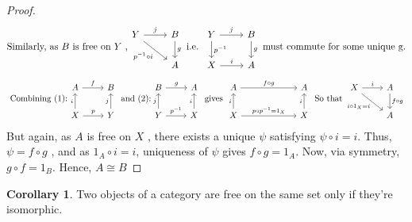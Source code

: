 \documentclass{article}
\theoremstyle{definition}
\theoremstyle{definition}
\newtheorem{corollary}{Corollary}[theorem]
\begin{document}
\begin{proof}
	\begin{equation}
		\text{Similarly, as $ B$  is free on $ Y $ ,}
		\begin{tikzcd}
			Y \arrow{r}{j} \arrow[swap]{dr}{p^{-1} \circ i} & B  \arrow{d}{g} \\ & A
		\end{tikzcd}
		\text{ i.e. }
		\begin{tikzcd}
			Y \arrow{r}{j} \arrow{d}{p^{-1}} & B  \arrow{d}{g} \\ X \arrow{r}{i} & A
		\end{tikzcd}
		\text{ must commute for some unique g.}
	\end{equation}
	\begin{equation*}
		\text{ Combining (1):}
		\begin{tikzcd}
			A \arrow{r}{f} & B \\ X \arrow{u}{i} \arrow{r}{p} & Y\arrow{u}{j}
		\end{tikzcd}
		\text{ and (2):}
		\begin{tikzcd}
			B \arrow{r}{g} & A \\ Y \arrow{u}{j} \arrow{r}{p^{-1}} & X\arrow{u}{i}
		\end{tikzcd}
		\text{ gives }
		\begin{tikzcd}
			A \arrow{r}{f \circ g} &[4em] A \\ X \arrow{u}{i} \arrow{r}{p \circ p^{-1} = 1_X} & X\arrow{u}{i}
		\end{tikzcd}
		\text{ So that }
		\begin{tikzcd}
			X \arrow{r}{i} \arrow[swap]{dr}{i \circ 1_X = i} &A \arrow{d}{f \circ g} \\ &A
		\end{tikzcd}
	\end{equation*}
	But again, as $ A $ is free on $ X $ , there exists a unique $ \psi $ satisfying $ \psi \circ i = i $. Thus, $ \psi = f \circ g $ , and as $ 1_A \circ i = i $, uniqueness of $ \psi $ gives $ f \circ g = 1_A $. Now, via symmetry, $ g \circ f = 1_B $. Hence, $A \cong B$
\end{proof}
\begin{corollary}
	Two objects of a category are free on the same set only if they're isomorphic.
\end{corollary}
\end{document}
